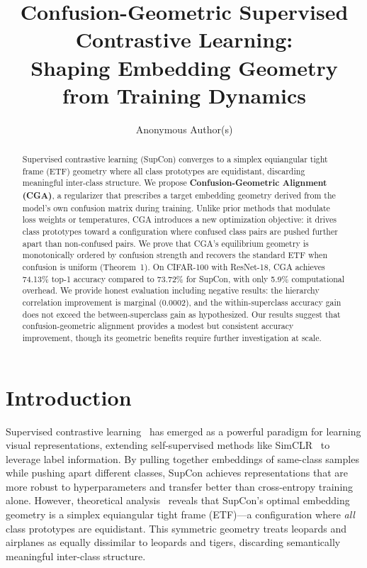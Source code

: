 \documentclass{article}
\title{Confusion-Geometric Supervised Contrastive Learning:\\Shaping Embedding Geometry from Training Dynamics}
\author{
  Anonymous Author(s)
}
\begin{document}
\maketitle

\begin{abstract}
Supervised contrastive learning (SupCon) converges to a simplex equiangular tight frame (ETF) geometry where all class prototypes are equidistant, discarding meaningful inter-class structure. We propose \textbf{Confusion-Geometric Alignment (CGA)}, a regularizer that prescribes a target embedding geometry derived from the model's own confusion matrix during training. Unlike prior methods that modulate loss weights or temperatures, CGA introduces a new optimization objective: it drives class prototypes toward a configuration where confused class pairs are pushed further apart than non-confused pairs. We prove that CGA's equilibrium geometry is monotonically ordered by confusion strength and recovers the standard ETF when confusion is uniform (Theorem~1). On CIFAR-100 with ResNet-18, CGA achieves 74.13\% top-1 accuracy compared to 73.72\% for SupCon, with only 5.9\% computational overhead. We provide honest evaluation including negative results: the hierarchy correlation improvement is marginal (0.0002), and the within-superclass accuracy gain does not exceed the between-superclass gain as hypothesized. Our results suggest that confusion-geometric alignment provides a modest but consistent accuracy improvement, though its geometric benefits require further investigation at scale.
\end{abstract}

\section{Introduction}
\label{sec:intro}

Supervised contrastive learning~\citep{khosla2020supervised} has emerged as a powerful paradigm for learning visual representations, extending self-supervised methods like SimCLR~\citep{chen2020simple} to leverage label information. By pulling together embeddings of same-class samples while pushing apart different classes, SupCon achieves representations that are more robust to hyperparameters and transfer better than cross-entropy training alone. However, theoretical analysis~\citep{papyan2020prevalence, lee2025theoretical} reveals that SupCon's optimal embedding geometry is a simplex equiangular tight frame (ETF)---a configuration where \emph{all} class prototypes are equidistant. This symmetric geometry treats leopards and airplanes as equally dissimilar to leopards and tigers, discarding semantically meaningful inter-class structure.
\end{document}
